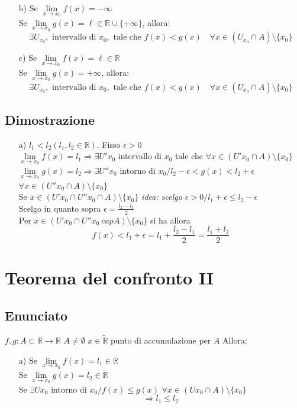 \documentclass{article}
\newcommand{\R}{\mathbb{R}}
\newcommand{\Rext}{\widetilde{\mathbb{R}}}
\newcommand{\vSpace}{\vspace{1em}}
\begin{document}
\begin{flushleft}
\begin{enumerate}
    \item[b)] Se \( \lim\limits_{x \to x_0} f(x) = -\infty \) \\
          Se \( \lim\limits_{x \to x_0} g(x) = \ell \in \mathbb{R} \cup \{+\infty\} \), allora:
          \[
          \exists U_{x_0}, \text{ intervallo di } x_0, \text{ tale che } f(x) < g(x) \quad \forall x \in (U_{x_0} \cap A) \setminus \{x_0\}
          \]

    \item[c)] Se \( \lim\limits_{x \to x_0} f(x) = \ell \in \mathbb{R} \) \\
          Se \( \lim\limits_{x \to x_0} g(x) = +\infty \), allora:
          \[
          \exists U_{x_0}, \text{ intervallo di } x_0, \text{ tale che } f(x) < g(x) \quad \forall x \in (U_{x_0} \cap A) \setminus \{x_0\}
          \]
\end{enumerate}

\subsection{Dimostrazione}
\begin{enumerate}
    \item[a)]
    $l_1 < l_2 (l_1,l_2 \in \R)$. Fisso $\epsilon>0$\\
    $\lim\limits_{x \to x_0} f(x)=l_1 \Rightarrow \exists U' x_0$ intervallo di $x_0$ tale che $\forall x \in (U' x_0 \cap A)\setminus \{x_0\}$
    \\$\lim\limits_{x \to x_0} g(x) = l_2 \Rightarrow \exists U'' x_0$ intorno di $x_0 / l_2 - \epsilon < g(x) < l_2 + \epsilon$ $\forall x \in (U'' x_0 \cap A) \setminus \{x_0\}$
    \vSpace
    \\Se $x \in (U' x_0 \cap U'' x_0 \cap A) \setminus \{x_0\}$ \textit{idea: scelgo $\epsilon>0 / l_1 + \epsilon \leq l_2 - \epsilon$}
    \\Scelgo in quanto sopra $\epsilon = \frac{l_2 - l_1}{2}$
    \\Per $x \in (U' x_0 \cap U'' x_0 \ cap A) \setminus \{x_0\}$ si ha allora 
    \[f(x) < l_1 + \epsilon = l_1 + \frac{l_2 - l_1}{2} = \frac{l_1 + l_2}{2}\]
\end{enumerate}


\section{Teorema del confronto II}
\subsection{Enunciato}
$f, g: A \subset \R \rightarrow \R$ $A \neq \emptyset$ $x \in \Rext$ punto di accumulazione per $A$ Allora:
\begin{enumerate}
        \item[a)]
        Se $\lim\limits_{x \to x_0} f(x) = l_1 \in \R$
        \\Se $\lim\limits_{x \to x_0} g(x) = l_2 \in \R$
        \\Se $\exists U x_0$ intorno di $x_0 / f(x) \leq g(x)$ $\forall x \in (U x_0 \cap A)\setminus \{x_0\}$
        \[\Rightarrow l_1 \leq l_2\]


\end{enumerate}
\end{flushleft}
\end{document}

